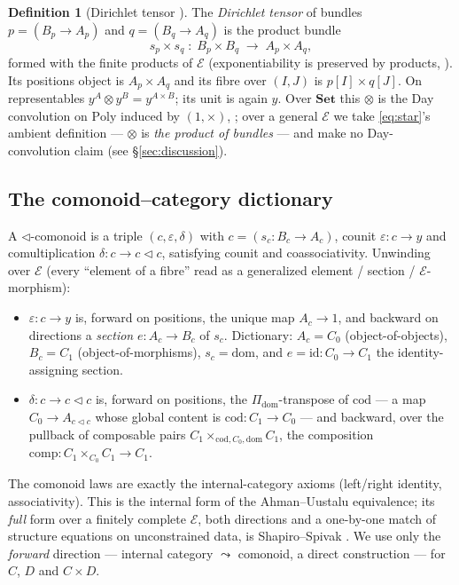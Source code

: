\documentclass[11pt]{amsart}
\theoremstyle{plain}
\theoremstyle{definition}
\newtheorem{definition}[theorem]{Definition}
\theoremstyle{remark}
\newcommand{\Set}{\mathbf{Set}}
\newcommand{\Poly}{\mathrm{Poly}}
\newcommand{\Ee}{\mathcal{E}}
\newcommand{\sub}{\triangleleft}      %
\newcommand{\dir}[1]{[#1]}
\newcommand{\id}{\mathrm{id}}
\newcommand{\dom}{\mathrm{dom}}
\newcommand{\cod}{\mathrm{cod}}
\newcommand{\comp}{\mathrm{comp}}
\begin{document}
\begin{definition}[Dirichlet tensor {\cite[Def.~4.1]{ShapiroSpivak2023}}]
The \emph{Dirichlet tensor} of bundles $p=(B_p\to A_p)$ and $q=(B_q\to A_q)$ is the product bundle
\[
   s_p\times s_q\;:\;B_p\times B_q\;\longrightarrow\;A_p\times A_q,
\]
formed with the finite products of $\Ee$ (exponentiability is preserved by products,
\cite[Lem.~4.3]{ShapiroSpivak2023}). Its positions object is $A_p\times A_q$ and its fibre over
$(I,J)$ is $p\dir{I}\times q\dir{J}$. On representables $y^A\otimes y^B=y^{A\times B}$; its unit is
again $y$. Over $\Set$ this $\otimes$ is the Day convolution on $\Poly$ induced by $(1,\times)$,
\cite[Prop.~3.79]{NiuSpivak2023}; over a general $\Ee$ we take \eqref{eq:star}'s ambient definition
--- $\otimes$ is \emph{the product of bundles} --- and make no Day-convolution claim (see
\S\ref{sec:discussion}).
\end{definition}

\subsection{The comonoid--category dictionary}\label{sub:dictionary}

A $\sub$-comonoid is a triple $(c,\varepsilon,\delta)$ with $c=(s_c:B_c\to A_c)$, counit
$\varepsilon:c\to y$ and comultiplication $\delta:c\to c\sub c$, satisfying counit and
coassociativity. Unwinding over $\Ee$ (every ``element of a fibre'' read as a generalized element /
section / $\Ee$-morphism):

\begin{itemize}
\item $\varepsilon:c\to y$ is, forward on positions, the unique map $A_c\to1$, and backward on
directions a \emph{section} $e:A_c\to B_c$ of $s_c$. Dictionary: $A_c=C_0$ (object-of-objects),
$B_c=C_1$ (object-of-morphisms), $s_c=\dom$, and $e=\id:C_0\to C_1$ the identity-assigning section.
\item $\delta:c\to c\sub c$ is, forward on positions, the $\Pi_{\dom}$-transpose of $\cod$ ---
a map $C_0\to A_{c\sub c}$ whose global content is $\cod:C_1\to C_0$ --- and backward, over the
pullback of composable pairs $C_1\times_{\cod,C_0,\dom}C_1$, the composition $\comp:C_1\times_{C_0}C_1\to C_1$.
\end{itemize}

\noindent The comonoid laws are exactly the internal-category axioms (left/right identity,
associativity). This is the internal form of the Ahman--Uustalu equivalence; its \emph{full} form
over a finitely complete $\Ee$, both directions and a one-by-one match of structure equations on
unconstrained data, is Shapiro--Spivak \cite[Thm.~5.6, Rem.~5.7]{ShapiroSpivak2023}. We use only the
\emph{forward} direction --- internal category $\leadsto$ comonoid, a direct construction --- for $C$,
$D$ and $C\times D$.
\end{document}
